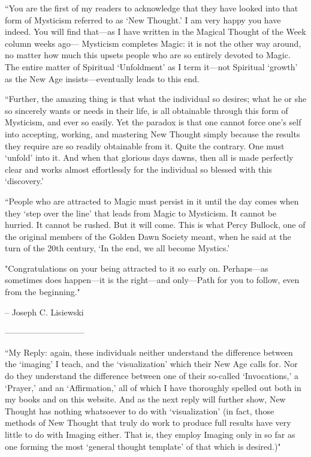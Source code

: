 \begin{footnotesize}
\begin{sffamily}
``You are the first of my readers to acknowledge that they have looked into that form of Mysticism referred to as `New Thought.' I am very happy you have indeed. You will find that—as I have written in the Magical Thought of the Week column weeks ago— Mysticism completes Magic: it is not the other way around, no matter how much this upsets people who are so entirely devoted to Magic. The entire matter of Spiritual `Unfoldment' as I term it—not Spiritual `growth' as the New Age insists—eventually leads to this end.

``Further, the amazing thing is that what the individual so desires; what he or she so sincerely wants or needs in their life, is all obtainable through this form of Mysticism, and ever so easily. Yet the paradox is that one cannot force one's self into accepting, working, and mastering New Thought simply because the results they require are so readily obtainable from it. Quite the contrary. One must `unfold' into it. And when that glorious days dawns, then all is made perfectly clear and works almost effortlessly for the individual so blessed with this `discovery.'

``People who are attracted to Magic must persist in it until the day comes when they `step over the line' that leads from Magic to Mysticism. It cannot be hurried. It cannot be rushed. But it will come. This is what Percy Bullock, one of the original members of the Golden Dawn Society meant, when he said at the turn of the 20th century, `In the end, we all become Mystics.' 

"Congratulations on your being attracted to it so early on. Perhaps—as sometimes does happen—it is the right—and only—Path for you to follow, even from the beginning."

– Joseph C. Lisiewski

—————————–

``My Reply: again, these individuals neither understand the difference between the `imaging' I teach, and the `visualization' which their New Age calls for. Nor do they understand the difference between one of their so-called `Invocations,' a `Prayer,' and an `Affirmation,' all of which I have thoroughly spelled out both in my books and on this website. And as the next reply will further show, New Thought has nothing whatsoever to do with `visualization' (in fact, those methods of New Thought that truly do work to produce full results have very little to do with Imaging either. That is, they employ Imaging only in so far as one forming the most `general thought template' of that which is desired.)"


\end{sffamily}
\end{footnotesize}
